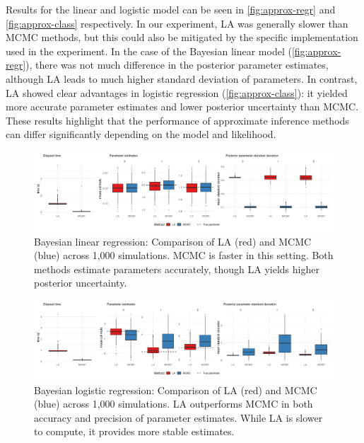 Results for the linear and logistic model can be seen in \autoref{fig:approx-regr} and \autoref{fig:approx-class} respectively.
In our experiment, LA was generally slower than MCMC methods, but this could also be mitigated by the specific implementation used in the experiment.
In the case of the Bayesian linear model (\autoref{fig:approx-regr}), there was not much difference in the posterior parameter estimates, although LA leads to much higher standard deviation of parameters.
In contrast, LA showed clear advantages in logistic regression (\autoref{fig:approx-class}): it yielded more accurate parameter estimates and lower posterior uncertainty than MCMC. These results highlight that the performance of approximate inference methods can differ significantly depending on the model and likelihood.

\begin{figure}[htbp]
    \centering
    \includegraphics[width=\linewidth]{../figures/approx_regr.png}
    \caption{
    Bayesian linear regression: Comparison of LA (red) and MCMC (blue) across 1,000 simulations. MCMC is faster in this setting. Both methods estimate parameters accurately, though LA yields higher posterior uncertainty. 
    }
    \label{fig:approx-regr}
\end{figure}

\begin{figure}[htbp]
    \centering
    \includegraphics[width=\linewidth]{../figures/approx_class.png}
    \caption{
    Bayesian logistic regression: Comparison of LA (red) and MCMC (blue) across 1,000 simulations. LA outperforms MCMC in both accuracy and precision of parameter estimates. While LA is slower to compute, it provides more stable estimates.
    }
    \label{fig:approx-class}
\end{figure}


